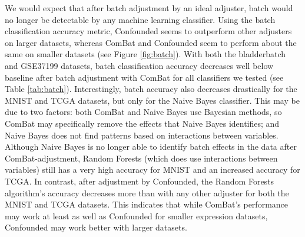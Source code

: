 \documentclass[notitlepage]{article}
\begin{document}
We would expect that after batch adjustment by an ideal adjuster, batch would no longer be detectable by any machine learning classifier.
Using the batch classification accuracy metric, Confounded seems to outperform other adjusters on larger datasets, whereas ComBat and Confounded seem to perform about the same on smaller datasets (see Figure \ref{fig:batch}).
With both the bladderbatch and GSE37199 datasets, batch classification accuracy decreases well below baseline after batch adjustment with ComBat for all classifiers we tested (see Table \ref{tab:batch}).
Interestingly, batch accuracy also decreases drastically for the MNIST and TCGA datasets, but only for the Naive Bayes classifier.
This may be due to two factors: both ComBat and Naive Bayes use Bayesian methods, so ComBat may specifically remove the effects that Naive Bayes identifies; and Naive Bayes does not find patterns based on interactions between variables.
Although Naive Bayes is no longer able to identify batch effects in the data after ComBat-adjustment, Random Forests (which does use interactions between variables) still has a very high accuracy for MNIST and an increased accuracy for TCGA.
In contrast, after adjustment by Confounded, the Random Forests algorithm's accuracy decreases more than with any other adjuster for both the MNIST and TCGA datasets.
This indicates that while ComBat's performance may work at least as well as Confounded for smaller expression datasets, Confounded may work better with larger datasets.
\end{document}
